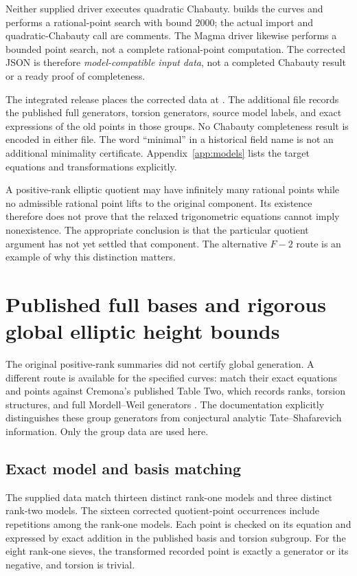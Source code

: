 \documentclass[11pt,letterpaper]{article}
\theoremstyle{definition}\newtheorem{definition}[theorem]{Definition}
\theoremstyle{remark}\newtheorem{remark}[theorem]{Remark}
\begin{document}
Neither supplied driver executes quadratic Chabauty.  builds the curves and performs a rational-point search with bound 2000; the actual import and quadratic-Chabauty call are comments. The Magma driver likewise performs a bounded point search, not a complete rational-point computation. The corrected JSON is therefore \emph{model-compatible input data}, not a completed Chabauty result or a ready proof of completeness.


The integrated release places the corrected data at . The additional file  records the published full generators, torsion generators, source model labels, and exact expressions of the old points in those groups. No Chabauty completeness result is encoded in either file. The word ``minimal'' in a historical field name is not an additional minimality certificate. Appendix~\ref{app:models} lists the target equations and transformations explicitly.

A positive-rank elliptic quotient may have infinitely many rational points while no admissible rational point lifts to the original component. Its existence therefore does not prove that the relaxed trigonometric equations cannot imply nonexistence. The appropriate conclusion is that the particular quotient argument has not yet settled that component. The alternative $F{-}2$ route is an example of why this distinction matters.

\section{Published full bases and rigorous global elliptic height bounds}\label{sec:newarithmetic}
The original positive-rank summaries did not certify global generation. A different route is available for the specified curves: match their exact equations and points against Cremona's published Table Two, which records ranks, torsion structures, and full Mordell--Weil generators \cite{CremonaData}. The documentation explicitly distinguishes these group generators from conjectural analytic Tate--Shafarevich information. Only the group data are used here.

\subsection{Exact model and basis matching}
The supplied data match thirteen distinct rank-one models and three distinct rank-two models. The sixteen corrected quotient-point occurrences include repetitions among the rank-one models. Each point is checked on its equation and expressed by exact addition in the published basis and torsion subgroup. For the eight rank-one sieves, the transformed recorded point is exactly a generator or its negative, and torsion is trivial.
\end{document}

